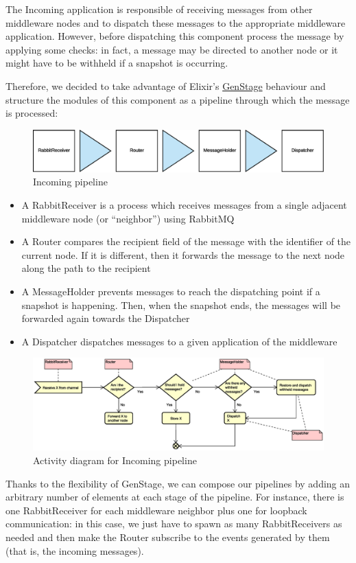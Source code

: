 The Incoming application is responsible of receiving messages from other
middleware nodes and to dispatch these messages to the appropriate middleware
application.
However, before dispatching this component process the message by applying some
checks: in fact, a message may be directed to another node or it might have to
be withheld if a snapshot is occurring.

Therefore, we decided to take advantage of Elixir's
\href{https://hexdocs.pm/gen_stage/GenStage.html}{GenStage} behaviour and
structure the modules of this component as a pipeline through which the
message is processed:

\begin{figure}[H]
  \centering
  \includegraphics[width=\columnwidth]{images/solution/mw/inc/architect.eps}
  \caption{Incoming pipeline}
  \label{fig:mw-incoming}
\end{figure}

\begin{itemize}
  \item A RabbitReceiver is a process which receives messages from a single
    adjacent middleware node (or ``neighbor'') using RabbitMQ
  \item A Router compares the recipient field of the message with the
    identifier of the current node. If it is different, then it forwards the
    message to the next node along the path to the recipient
  \item A MessageHolder prevents messages to reach the dispatching point if a
    snapshot is happening. Then, when the snapshot ends, the messages will be
    forwarded again towards the Dispatcher
  \item A Dispatcher dispatches messages to a given application of the middleware
\end{itemize}

\begin{figure}[H]
  \centering
  \includegraphics[width=\columnwidth]{images/solution/mw/inc/activity.eps}
  \caption{Activity diagram for Incoming pipeline}
  \label{fig:mw-incoming-activity}
\end{figure}

Thanks to the flexibility of GenStage, we can compose our pipelines by adding
an arbitrary number of elements at each stage of the pipeline. For instance,
there is one RabbitReceiver for each middleware neighbor plus one for loopback
communication: in this case, we just have to spawn as many RabbitReceivers as
needed and then make the Router subscribe to the events generated by them
(that is, the incoming messages).
